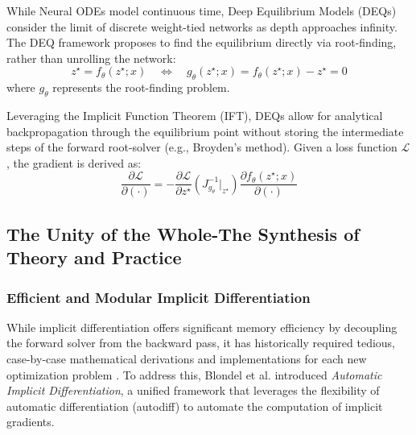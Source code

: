\documentclass{article}
\begin{document}
While Neural ODEs model continuous time, Deep Equilibrium Models (DEQs) \cite{bai2019deq} consider the limit of discrete weight-tied networks as depth approaches infinity. The DEQ framework proposes to find the equilibrium directly via root-finding, rather than unrolling the network:
\begin{equation}
  z^\star = f_\theta(z^\star; x) \quad \iff \quad g_\theta(z^\star; x) = f_\theta(z^\star; x) - z^\star = 0
\end{equation}
where $g_\theta$ represents the root-finding problem.

Leveraging the Implicit Function Theorem (IFT), DEQs allow for analytical backpropagation through the equilibrium point without storing the intermediate steps of the forward root-solver (e.g., Broyden's method). Given a loss function $\mathcal{L}$, the gradient is derived as:
\begin{equation}
  \frac{\partial \mathcal{L}}{\partial (\cdot)} = - \frac{\partial \mathcal{L}}{\partial z^\star} (J_{g_\theta}^{-1}|_{z^\star}) \frac{\partial f_\theta(z^\star; x)}{\partial (\cdot)}
\end{equation}

\subsection{The Unity of the Whole-The Synthesis of Theory and Practice}

\subsubsection{Efficient and Modular Implicit Differentiation}

While implicit differentiation offers significant memory efficiency by decoupling the forward solver from the backward pass, it has historically required tedious, case-by-case mathematical derivations and implementations for each new optimization problem \cite{blondel2021efficient}. To address this, Blondel et al. introduced \textit{Automatic Implicit Differentiation}, a unified framework that leverages the flexibility of automatic differentiation (autodiff) to automate the computation of implicit gradients.
\end{document}
